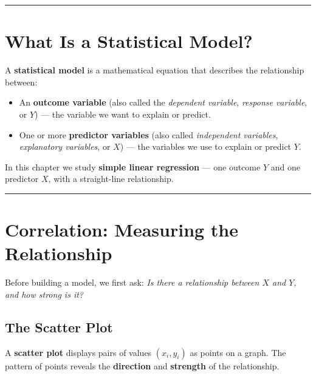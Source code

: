 \documentclass[
  12pt,
  letterpaper,
]{book}
\providecommand{\tightlist}{%
  \setlength{\itemsep}{0pt}\setlength{\parskip}{0pt}}
\begin{document}
\begin{center}\rule{0.5\linewidth}{0.5pt}\end{center}


\chapter{What Is a Statistical
Model?}\label{what-is-a-statistical-model}

A \textbf{statistical model} is a mathematical equation that describes
the relationship between:

\begin{itemize}
\tightlist
\item
  An \textbf{outcome variable} (also called the \emph{dependent
  variable}, \emph{response variable}, or \(Y\)) --- the variable we
  want to explain or predict.
\item
  One or more \textbf{predictor variables} (also called
  \emph{independent variables}, \emph{explanatory variables}, or \(X\))
  --- the variables we use to explain or predict \(Y\).
\end{itemize}

In this chapter we study \textbf{simple linear regression} --- one
outcome \(Y\) and one predictor \(X\), with a straight-line
relationship.

\begin{center}\rule{0.5\linewidth}{0.5pt}\end{center}


\chapter{Correlation: Measuring the
Relationship}\label{correlation-measuring-the-relationship}

Before building a model, we first ask: \emph{Is there a relationship
between \(X\) and \(Y\), and how strong is it?}

\section{The Scatter Plot}\label{the-scatter-plot}

A \textbf{scatter plot} displays pairs of values \((x_i, y_i)\) as
points on a graph. The pattern of points reveals the \textbf{direction}
and \textbf{strength} of the relationship.
\end{document}
